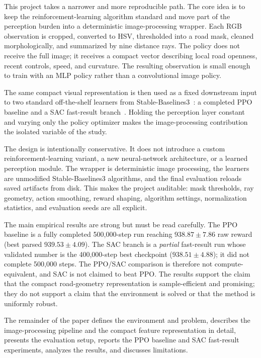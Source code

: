 \documentclass[conference]{IEEEtran}
\begin{document}
This project takes a narrower and more reproducible path. The core idea is to
keep the reinforcement-learning algorithm standard and move part of the
perception burden into a deterministic image-processing wrapper. Each RGB
observation is cropped, converted to HSV, thresholded into a road mask, cleaned
morphologically, and summarized by nine distance rays. The policy does not
receive the full image; it receives a compact vector describing local road
openness, recent controls, speed, and curvature. The resulting observation is
small enough to train with an MLP policy rather than a convolutional image
policy.

The same compact visual representation is then used as a fixed downstream input
to two standard off-the-shelf learners from Stable-Baselines3~\cite{ref_sb3,
ref_ppo_mod, ref_sac_mod}: a completed PPO~\cite{ref_ppo} baseline and a SAC
fast-result branch~\cite{ref_sac}. Holding the perception layer constant and
varying only the policy optimizer makes the image-processing contribution the
isolated variable of the study.

The design is intentionally conservative. It does not introduce a custom
reinforcement-learning variant, a new neural-network architecture, or a learned
perception module. The wrapper is deterministic image processing, the learners
are unmodified Stable-Baselines3 algorithms, and the final evaluation reloads
saved artifacts from disk. This makes the project auditable: mask thresholds,
ray geometry, action smoothing, reward shaping, algorithm settings,
normalization statistics, and evaluation seeds are all explicit.

The main empirical results are strong but must be read carefully. The PPO
baseline is a fully completed 500{,}000-step run reaching
$938.87\pm7.86$ raw reward (best parsed $939.53\pm4.09$). The SAC branch is a
\emph{partial} fast-result run whose validated number is the 400{,}000-step
best checkpoint ($938.51\pm4.88$); it did not complete 500{,}000 steps. The
PPO/SAC comparison is therefore not compute-equivalent, and SAC is not claimed
to beat PPO. The results support the claim that the compact road-geometry
representation is sample-efficient and promising; they do not support a claim
that the environment is solved or that the method is uniformly robust.

The remainder of the paper defines the environment and problem, describes the
image-processing pipeline and the compact feature representation in detail,
presents the evaluation setup, reports the PPO baseline and SAC fast-result
experiments, analyzes the results, and discusses limitations.
\end{document}
